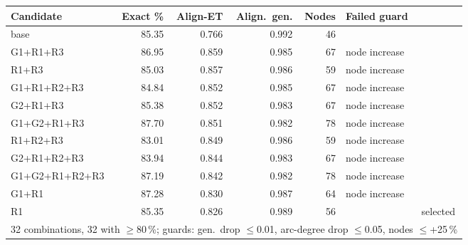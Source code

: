 \begin{tabular}{lrrrrll}
\hline
Candidate & Exact \% & Align-ET & Align.\ gen. & Nodes & Failed guard & \\
\hline
base & 85.35 & 0.766 & 0.992 & 46 & & \\
G1+R1+R3 & 86.95 & 0.859 & 0.985 & 67 & node increase &  \\
R1+R3 & 85.03 & 0.857 & 0.986 & 59 & node increase &  \\
G1+R1+R2+R3 & 84.84 & 0.852 & 0.985 & 67 & node increase &  \\
G2+R1+R3 & 85.38 & 0.852 & 0.983 & 67 & node increase &  \\
G1+G2+R1+R3 & 87.70 & 0.851 & 0.982 & 78 & node increase &  \\
R1+R2+R3 & 83.01 & 0.849 & 0.986 & 59 & node increase &  \\
G2+R1+R2+R3 & 83.94 & 0.844 & 0.983 & 67 & node increase &  \\
G1+G2+R1+R2+R3 & 87.19 & 0.842 & 0.982 & 78 & node increase &  \\
G1+R1 & 87.28 & 0.830 & 0.987 & 64 & node increase &  \\
R1 & 85.35 & 0.826 & 0.989 & 56 &  & selected \\
\hline
\multicolumn{7}{l}{32 combinations, 32 with $\geq$80\,\%; guards: gen.\ drop $\leq$0.01, arc-degree drop $\leq$0.05, nodes $\leq$+25\,\%} \\
\hline
\end{tabular}
